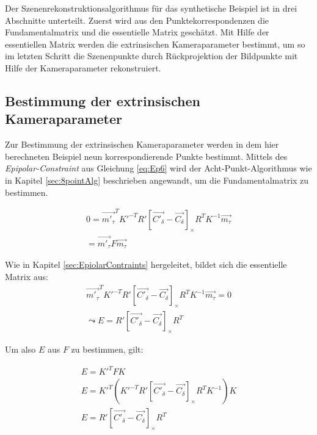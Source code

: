 Der Szenenrekonstruktionsalgorithmus für das synthetische Beispiel ist in drei Abschnitte unterteilt. Zuerst wird aus den Punktekorrespondenzen die Fundamentalmatrix und die essentielle Matrix geschätzt. Mit Hilfe der essentiellen Matrix werden die extrinsischen Kameraparameter bestimmt, um so im letzten Schritt die Szenenpunkte durch Rückprojektion der Bildpunkte mit Hilfe der Kameraparameter rekonstruiert. 

\subsection{Bestimmung der extrinsischen Kameraparameter}

Zur Bestimmung der extrinsischen Kameraparameter werden in dem hier berechneten Beispiel neun korrespondierende Punkte bestimmt. Mittels des \textit{Epipolar-Constraint} aus Gleichung \ref{eq:Ep6} wird der Acht-Punkt-Algorithmus wie in Kapitel \ref{sec:8pointAlg} beschrieben angewandt, um die Fundamentalmatrix zu bestimmen.

\begin{gather}
	0=\vec{m'_\tau}^TK'^{-T}R' \left[ \vec{C'_\delta}-\vec{C_\delta}\right]_\times R^TK^{-1}\vec{m_\tau}\\
	=\vec{m'_\tau}F\vec{m_\tau}
\end{gather}


Wie in Kapitel \ref{sec:EpiolarContraints} hergeleitet, bildet sich die essentielle Matrix aus:
\begin{gather}
	\vec{m'_\tau}^TK'^{-T}R' \left[ \vec{C'_\delta}-\vec{C_\delta}\right]_\times R^TK^{-1}\vec{m_\tau}=0\\
	\leadsto E = R' \left[ \vec{C'_\delta}-\vec{C_\delta}\right]_\times R^T		
\end{gather}

Um also $E$ aus $F$ zu bestimmen, gilt:


\begin{gather}
	 E= K'^T F K\\
    E= K'^T (K'^{-T}R' \left[ \vec{C'_\delta}-\vec{C_\delta}\right]_\times R^TK^{-1}) K\\
	E = R' \left[ \vec{C'_\delta}-\vec{C_\delta}\right]_\times R^T	
\end{gather}

